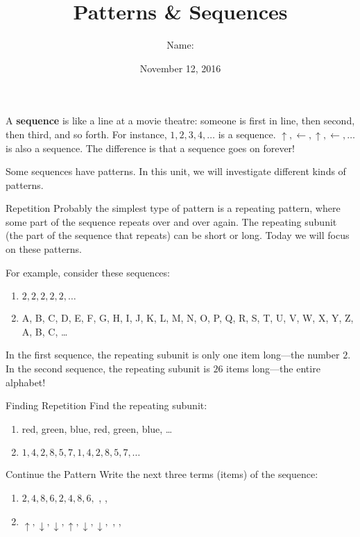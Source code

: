 \documentclass[12pt,letterpaper]{article}
\title{Patterns \& Sequences}
\author{Name: \underline{\hspace{5cm}}}
\date{November 12, 2016}
\begin{document}
\HomeworkTitle

\thispagestyle{empty}

A \textbf{sequence} is like a line at a movie theatre: someone is first in line,
then second, then third, and so forth. For instance, $1, 2, 3, 4, \ldots$ is a
sequence. $\uparrow, \leftarrow, \uparrow, \leftarrow, \ldots$ is also a
sequence. The difference is that a sequence goes on forever!

Some sequences have patterns. In this unit, we will investigate different kinds
of patterns.

\begin{step}{Repetition}
Probably the simplest type of pattern is a repeating pattern, where some part of
the sequence repeats over and over again. The repeating subunit (the part of the
sequence that repeats) can be short or long. Today we will focus on these
patterns.

For example, consider these sequences:

\begin{enumerate}
\item $2, 2, 2, 2, 2, \ldots$
\item A, B, C, D, E, F, G, H, I, J, K, L, M, N, O, P, Q, R, S, T, U, V, W, X,
Y, Z, A, B, C, \ldots
\end{enumerate}

In the first sequence, the repeating subunit is only one item long---the number
$2$. In the second sequence, the repeating subunit is $26$ items long---the
entire alphabet!
\end{step}

\begin{problem}{Finding Repetition}
Find the repeating subunit:

\begin{enumerate}[\hspace{.5cm}a.]
\item red, green, blue, red, green, blue, \ldots
\item $1, 4, 2, 8, 5, 7, 1, 4, 2, 8, 5, 7, \ldots$
\end{enumerate}
\end{problem}

\begin{problem}{Continue the Pattern}
Write the next three terms (items) of the sequence:

\begin{enumerate}[\hspace{.5cm}a.]
\item $2, 4, 8, 6, 2, 4, 8, 6,$ \underline{\hspace{1em}},
\underline{\hspace{1em}}, \underline{\hspace{1em}}
\item $\uparrow, \downarrow, \downarrow, \uparrow, \downarrow, \downarrow,$
\underline{\hspace{1em}}, \underline{\hspace{1em}}, \underline{\hspace{1em}}
\end{enumerate}
\end{problem}
\end{document}
